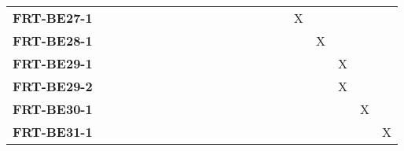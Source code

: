 \documentclass[12pt, titlepage]{article}
\begin{document}
\begin{landscape}
\begin{longtable}{|l|ccccccccccccccc|}
		\textbf{FRT-BE27-1} & ~                                                         & ~             & ~             & ~             & ~             & ~             & ~             & ~             & ~             & ~             & X             & ~             & ~             & ~             & ~             \\
		\textbf{FRT-BE28-1} & ~                                                         & ~             & ~             & ~             & ~             & ~             & ~             & ~             & ~             & ~             & ~             & X             & ~             & ~             & ~             \\
		\textbf{FRT-BE29-1} & ~                                                         & ~             & ~             & ~             & ~             & ~             & ~             & ~             & ~             & ~             & ~             & ~             & X             & ~             & ~             \\
		\textbf{FRT-BE29-2} & ~                                                         & ~             & ~             & ~             & ~             & ~             & ~             & ~             & ~             & ~             & ~             & ~             & X             & ~             & ~             \\
		\textbf{FRT-BE30-1} & ~                                                         & ~             & ~             & ~             & ~             & ~             & ~             & ~             & ~             & ~             & ~             & ~             & ~             & X             & ~             \\
		\textbf{FRT-BE31-1} & ~                                                         & ~             & ~             & ~             & ~             & ~             & ~             & ~             & ~             & ~             & ~             & ~             & ~             & ~             & X             \\
		\hline
	\end{longtable}

	\newpage


\end{landscape}
\end{document}
